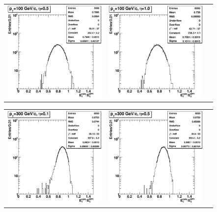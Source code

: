 \documentclass{cmspaper}
\begin{document}
\begin{appendices}
\begin{center}
\begin{tabular}{lll}
 \includegraphics[width=2in]{figs/h_ETRatio_ET_py_fit_corr_eta0.5_pT100.eps} &
 \includegraphics[width=2in]{figs/h_ETRatio_ET_py_fit_corr_eta1.0_pT100.eps} \\
\end{tabular}
\end{center}
\begin{center}
\begin{tabular}{lll}
 \includegraphics[width=2in]{figs/h_ETRatio_ET_py_fit_corr_eta0.1_pT300.eps} &
 \includegraphics[width=2in]{figs/h_ETRatio_ET_py_fit_corr_eta0.5_pT300.eps} &

\end{tabular}
\end{center}
\end{appendices}
\end{document}
